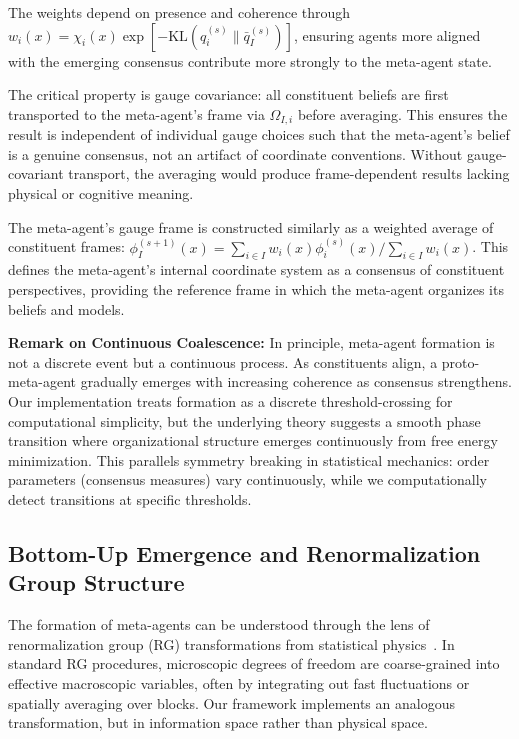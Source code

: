 \documentclass[11pt]{article}
\begin{document}
The weights depend on presence and coherence through $w_i(x) = \chi_i(x) \exp[-\mathrm{KL}(q_i^{(s)} \| \bar{q}_I^{(s)})]$, ensuring agents more aligned with the emerging consensus contribute more strongly to the meta-agent state.

The critical property is gauge covariance: all constituent beliefs are first transported to the meta-agent's frame via $\Omega_{I,i}$ before averaging. This ensures the result is independent of individual gauge choices such that the meta-agent's belief is a genuine consensus, not an artifact of coordinate conventions. Without gauge-covariant transport, the averaging would produce frame-dependent results lacking physical or cognitive meaning.

The meta-agent's gauge frame is constructed similarly as a weighted average of constituent frames: $\phi_I^{(s+1)}(x) = \sum_{i \in I} w_i(x) \phi_i^{(s)}(x) / \sum_{i \in I} w_i(x)$. This defines the meta-agent's internal coordinate system as a consensus of constituent perspectives, providing the reference frame in which the meta-agent organizes its beliefs and models.

\textbf{Remark on Continuous Coalescence:} In principle, meta-agent formation is not a discrete event but a continuous process. As constituents align, a proto-meta-agent gradually emerges with increasing coherence as consensus strengthens. Our implementation treats formation as a discrete threshold-crossing for computational simplicity, but the underlying theory suggests a smooth phase transition where organizational structure emerges continuously from free energy minimization. This parallels symmetry breaking in statistical mechanics: order parameters (consensus measures) vary continuously, while we computationally detect transitions at specific thresholds.


\subsection{Bottom-Up Emergence and Renormalization Group Structure}

The formation of meta-agents can be understood through the lens of renormalization group (RG) transformations from statistical physics~\cite{Wilson1971,Cardy1996}. In standard RG procedures, microscopic degrees of freedom are coarse-grained into effective macroscopic variables, often by integrating out fast fluctuations or spatially averaging over blocks. Our framework implements an analogous transformation, but in information space rather than physical space.
\end{document}
